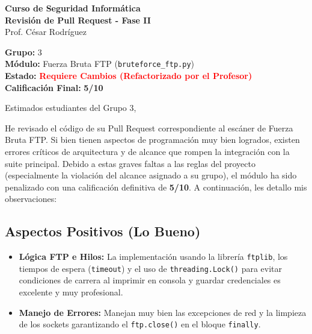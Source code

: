 \documentclass[12pt,letterpaper]{article}
\begin{document}
\begin{center}
    \Large \textbf{Curso de Seguridad Informática} \\
    \large \textbf{Revisión de Pull Request - Fase II} \\
    \vspace{0.3cm}
    \normalsize Prof. César Rodríguez \\
\end{center}

\vspace{0.5cm}

\noindent \textbf{Grupo:} 3 \\
\textbf{Módulo:} Fuerza Bruta FTP (\texttt{bruteforce\_ftp.py}) \\
\textbf{Estado:} \textcolor{red}{\textbf{Requiere Cambios (Refactorizado por el Profesor)}} \\
\textbf{Calificación Final:} \textbf{5/10}

\vspace{0.5cm}

\noindent Estimados estudiantes del Grupo 3,

\vspace{0.3cm}
He revisado el código de su Pull Request correspondiente al escáner de Fuerza Bruta FTP. Si bien tienen aspectos de programación muy bien logrados, existen errores críticos de arquitectura y de alcance que rompen la integración con la suite principal. Debido a estas graves faltas a las reglas del proyecto (especialmente la violación del alcance asignado a su grupo), el módulo ha sido penalizado con una calificación definitiva de \textbf{5/10}. A continuación, les detallo mis observaciones:

\subsection*{Aspectos Positivos (\textcolor{green!60!black}{Lo Bueno})}
\begin{itemize}
    \item \textbf{Lógica FTP e Hilos:} La implementación usando la librería \texttt{ftplib}, los tiempos de espera (\texttt{timeout}) y el uso de \texttt{threading.Lock()} para evitar condiciones de carrera al imprimir en consola y guardar credenciales es excelente y muy profesional.
    \item \textbf{Manejo de Errores:} Manejan muy bien las excepciones de red y la limpieza de los sockets garantizando el \texttt{ftp.close()} en el bloque \texttt{finally}.
\end{itemize}
\end{document}
